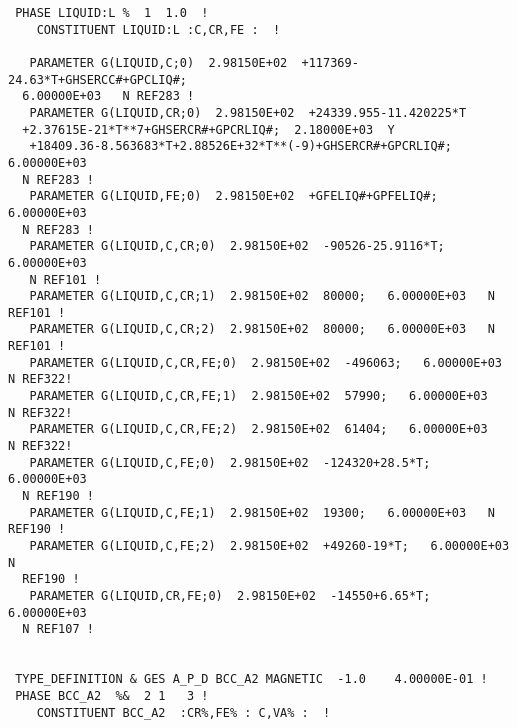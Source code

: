 \documentclass[12pt]{article}
\begin{document}
\begin{verbatim}
 PHASE LIQUID:L %  1  1.0  !
    CONSTITUENT LIQUID:L :C,CR,FE :  !

   PARAMETER G(LIQUID,C;0)  2.98150E+02  +117369-24.63*T+GHSERCC#+GPCLIQ#;   
  6.00000E+03   N REF283 !
   PARAMETER G(LIQUID,CR;0)  2.98150E+02  +24339.955-11.420225*T
  +2.37615E-21*T**7+GHSERCR#+GPCRLIQ#;  2.18000E+03  Y
   +18409.36-8.563683*T+2.88526E+32*T**(-9)+GHSERCR#+GPCRLIQ#;  6.00000E+03  
  N REF283 !
   PARAMETER G(LIQUID,FE;0)  2.98150E+02  +GFELIQ#+GPFELIQ#;   6.00000E+03   
  N REF283 !
   PARAMETER G(LIQUID,C,CR;0)  2.98150E+02  -90526-25.9116*T;   6.00000E+03  
   N REF101 !
   PARAMETER G(LIQUID,C,CR;1)  2.98150E+02  80000;   6.00000E+03   N REF101 !
   PARAMETER G(LIQUID,C,CR;2)  2.98150E+02  80000;   6.00000E+03   N REF101 !
   PARAMETER G(LIQUID,C,CR,FE;0)  2.98150E+02  -496063;   6.00000E+03 N REF322!
   PARAMETER G(LIQUID,C,CR,FE;1)  2.98150E+02  57990;   6.00000E+03   N REF322!
   PARAMETER G(LIQUID,C,CR,FE;2)  2.98150E+02  61404;   6.00000E+03   N REF322!
   PARAMETER G(LIQUID,C,FE;0)  2.98150E+02  -124320+28.5*T;   6.00000E+03   
  N REF190 !
   PARAMETER G(LIQUID,C,FE;1)  2.98150E+02  19300;   6.00000E+03   N REF190 !
   PARAMETER G(LIQUID,C,FE;2)  2.98150E+02  +49260-19*T;   6.00000E+03   N 
  REF190 !
   PARAMETER G(LIQUID,CR,FE;0)  2.98150E+02  -14550+6.65*T;   6.00000E+03   
  N REF107 !


 TYPE_DEFINITION & GES A_P_D BCC_A2 MAGNETIC  -1.0    4.00000E-01 !
 PHASE BCC_A2  %&  2 1   3 !
    CONSTITUENT BCC_A2  :CR%,FE% : C,VA% :  !


\end{verbatim}
\end{document}
